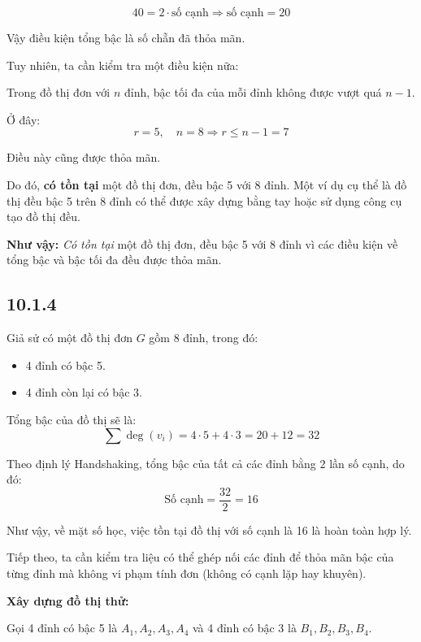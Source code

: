 \documentclass{article}
\begin{document}
	\[
	40 = 2 \cdot \text{số cạnh} \Rightarrow \text{số cạnh} = 20
	\]
	
	Vậy điều kiện tổng bậc là số chẵn đã thỏa mãn.
	
	Tuy nhiên, ta cần kiểm tra một điều kiện nữa:
	
	Trong đồ thị đơn với $n$ đỉnh, bậc tối đa của mỗi đỉnh không được vượt quá $n-1$.
	
	Ở đây:
	\[
	r = 5,\quad n = 8 \Rightarrow r \leq n-1 = 7
	\]
	
	Điều này cũng được thỏa mãn.
	
	Do đó, \textbf{có tồn tại} một đồ thị đơn, đều bậc 5 với 8 đỉnh. Một ví dụ cụ thể là đồ thị đều bậc 5 trên 8 đỉnh có thể được xây dựng bằng tay hoặc sử dụng công cụ tạo đồ thị đều.
	
	\textbf{Như vậy:} \textit{Có tồn tại} một đồ thị đơn, đều bậc 5 với 8 đỉnh vì các điều kiện về tổng bậc và bậc tối đa đều được thỏa mãn.
	
	\subsection*{10.1.4}
	Giả sử có một đồ thị đơn $G$ gồm 8 đỉnh, trong đó:
	
	\begin{itemize}
		\item 4 đỉnh có bậc 5.
		\item 4 đỉnh còn lại có bậc 3.
	\end{itemize}
	
	Tổng bậc của đồ thị sẽ là:
	\[
	\sum \deg(v_i) = 4 \cdot 5 + 4 \cdot 3 = 20 + 12 = 32
	\]
	
	Theo định lý Handshaking, tổng bậc của tất cả các đỉnh bằng $2$ lần số cạnh, do đó:
	\[
	\text{Số cạnh} = \frac{32}{2} = 16
	\]
	
	Như vậy, về mặt số học, việc tồn tại đồ thị với số cạnh là 16 là hoàn toàn hợp lý.
	
	Tiếp theo, ta cần kiểm tra liệu có thể ghép nối các đỉnh để thỏa mãn bậc của từng đỉnh mà không vi phạm tính đơn (không có cạnh lặp hay khuyên).
	
	\textbf{Xây dựng đồ thị thử:}
	
	Gọi 4 đỉnh có bậc 5 là $A_1, A_2, A_3, A_4$ và 4 đỉnh có bậc 3 là $B_1, B_2, B_3, B_4$.
	
\end{document}
